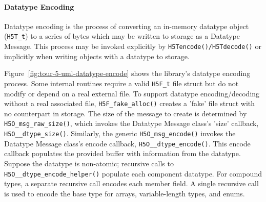 \paragraph{Datatype Encoding} Datatype encoding is the process of converting an in-memory datatype object (\texttt{H5T\_t}) to a series of bytes which may be written to storage as a Datatype Message. This process may be invoked explicitly by \texttt{H5Tencode()/H5Tdecode()} or implicitly when writing objects with a datatype to storage.

Figure~\ref{fig:tour-5-uml-datatype-encode} shows the library's datatype encoding process. Some internal routines require a valid \texttt{H5F\_t} file struct but do not modify or depend on a real external file. To support datatype encoding/decoding without a real associated file, \texttt{H5F\_fake\_alloc()} creates a 'fake' file struct with no counterpart in storage. The size of the message to create is determined by \texttt{H5O\_msg\_raw\_size()}, which invokes the Datatype Message class's  'size' callback, \texttt{H5O\_\_dtype\_size()}. Similarly, the generic \texttt{H5O\_msg\_encode()} invokes the Datatype Message class's encode callback, \texttt{H5O\_\_dtype\_encode()}. This encode callback populates the provided buffer with information from the datatype. Suppose the datatype is non-atomic; recursive calls to \texttt{H5O\_\_dtype\_encode\_helper()} populate each component datatype. For compound types, a separate recursive call encodes each member field. A single recursive call is used to encode the base type for arrays, variable-length types, and enums.

